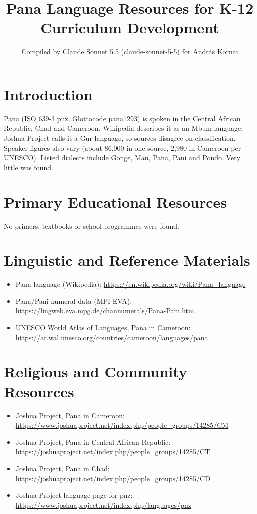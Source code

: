 \documentclass[12pt]{article}
\title{Pana Language Resources for K-12 Curriculum Development}
\author{Compiled by Claude Sonnet 5.5 (claude-sonnet-5-5) for Andr\'as Kornai}
\date{}
\begin{document}
\maketitle

\section{Introduction}
Pana (ISO 639-3 pnz; Glottocode pana1293) is spoken in the Central African Republic, Chad and Cameroon. Wikipedia describes it as an Mbum language; Joshua Project calls it a Gur language, so sources disagree on classification. Speaker figures also vary (about 86,000 in one source, 2,980 in Cameroon per UNESCO). Listed dialects include Gonge, Man, Pana, Pani and Pondo. Very little was found.

\section{Primary Educational Resources}
No primers, textbooks or school programmes were found.

\section{Linguistic and Reference Materials}
\begin{itemize}
\item Pana language (Wikipedia): \url{https://en.wikipedia.org/wiki/Pana_language}
\item Pana/Pani numeral data (MPI-EVA): \url{https://lingweb.eva.mpg.de/channumerals/Pana-Pani.htm}
\item UNESCO World Atlas of Languages, Pana in Cameroon: \url{https://ar.wal.unesco.org/countries/cameroon/languages/pana}
\end{itemize}

\section{Religious and Community Resources}
\begin{itemize}
\item Joshua Project, Pana in Cameroon: \url{https://www.joshuaproject.net/index.php/people_groups/14285/CM}
\item Joshua Project, Pana in Central African Republic: \url{https://joshuaproject.net/index.php/people_groups/14285/CT}
\item Joshua Project, Pana in Chad: \url{https://joshuaproject.net/index.php/people_groups/14285/CD}
\item Joshua Project language page for pnz: \url{https://www.joshuaproject.net/index.php/languages/pnz}
\end{itemize}
\end{document}
